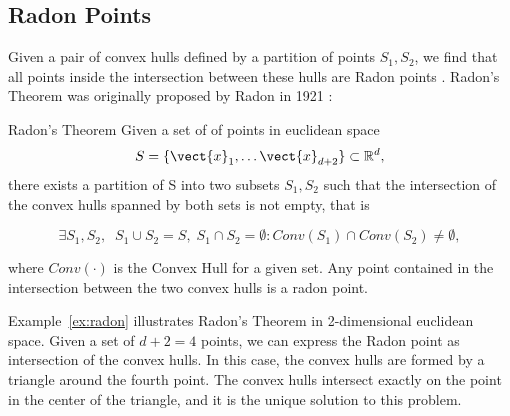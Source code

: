 \subsection{Radon Points}
Given a pair of convex hulls defined by a partition of points $S_1, S_2$, we find that all points inside the intersection between these hulls are Radon points . 
Radon's Theorem was originally proposed by Radon in 1921 \cite{radon1921mengen}:

\begin{threm}[label=thm:radon]{Radon's Theorem}
    Given a set of of points in euclidean space
    \begin{equation}
        S = \{\vect{x}_1, \ldots \vect{x}_{d+2}\} \subset \mathbb{R}^d,
    \end{equation}
   there exists a partition of S into two subsets $S_1, S_2$ such that the intersection of the convex hulls spanned by both sets is not empty, that is
    
    \begin{equation}
        \exists S_1, S_2, \;\; S_1 \cup S_2 = S, \; S_1 \cap S_2 = \emptyset: Conv(S_1) \cap Conv(S_2) \neq \emptyset,
    \end{equation}

    where $Conv(\cdot)$ is the Convex Hull for a given set.
    Any point contained in the intersection between the two convex hulls is a radon point.
\end{threm}

Example~\ref{ex:radon} illustrates Radon's Theorem in 2-dimensional euclidean space.
Given a set of $d+2 =4$ points, we can express the Radon point as intersection of the convex hulls.
In this case, the convex hulls are formed by a triangle around the fourth point.
The convex hulls intersect exactly on the point in the center of the triangle, and it is the unique solution to this problem.

